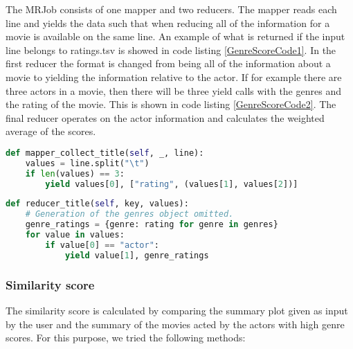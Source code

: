 The MRJob consists of one mapper and two reducers. The mapper reads each line and yields the data such that when reducing all of the information for a movie is available on the same line. An example of what is returned if the input line belongs to ratings.tsv is showed in code listing \ref{GenreScoreCode1}. In the first reducer the format is changed from being all of the information about a movie to yielding the information relative to the actor. If for example there are three actors in a movie, then there will be three yield calls with the genres and the rating of the movie. This is shown in code listing \ref{GenreScoreCode2}. The final reducer operates on the actor information and calculates the weighted average of the scores.
\begin{lstlisting}[language=Python, caption=Genre score mapper, label=GenreScoreCode1, breaklines=true]
def mapper_collect_title(self, _, line):
    values = line.split("\t")
    if len(values) == 3:
        yield values[0], ["rating", (values[1], values[2])]
\end{lstlisting}
\begin{lstlisting}[language=Python, caption=Genre score first reducer, label=GenreScoreCode2, breaklines=true]
def reducer_title(self, key, values):
    # Generation of the genres object omitted.
    genre_ratings = {genre: rating for genre in genres}
    for value in values:
        if value[0] == "actor":
            yield value[1], genre_ratings
\end{lstlisting}

\subsubsection{Similarity score}
The similarity score is calculated by comparing the summary plot given as input by the user and the summary of the movies acted by the actors with high genre scores. For this purpose, we tried the following methods:

